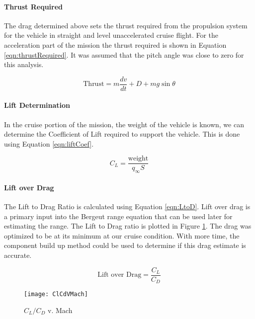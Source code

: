 \paragraph{Thrust Required}
The drag determined above sets the thrust required from the propulsion system for the vehicle in straight and level unaccelerated cruise flight.
For the acceleration part of the mission the thrust required is shown in Equation \ref{eqn:thrustRequired}. It was assumed that the pitch angle was close to zero for this analysis.

\begin{equation}
\label{eqn:thrustRequired}
\text{Thrust}=m\frac{dv}{dt}+D+mg\sin{\theta}
\end{equation}

\paragraph{Lift Determination}
In the cruise portion of the mission, the weight of the vehicle is known, we can determine the Coefficient of Lift required to support the vehicle. This is done using Equation \ref{eqn:liftCoef}.

\begin{equation}
\label{eqn:liftCoef}
C_L=\frac{\text{weight}}{q_{\infty}S}
\end{equation}

\paragraph{Lift over Drag}
The Lift to Drag Ratio is calculated using Equation \ref{eqn:LtoD}. Lift over drag is a primary input into the Bergeut range equation that can be used later for estimating the range. The Lift to Drag ratio is plotted in Figure \ref{fig:ClCdVMach}. The drag was optimized to be at its minimum at our cruise condition. With more time, the component build up method could be used to determine if this drag estimate is accurate.

\begin{equation}
\label{eqn:LtoD}
\text{Lift over Drag} = \frac{C_L}{C_D}
\end{equation}

\begin{figure}[H]
\texttt{[image: ClCdVMach]}
\caption{$C_L/C_D$ v. Mach}
\label{fig:ClCdVMach}
\end{figure}